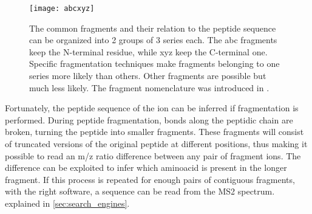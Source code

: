 \documentclass[thesis]{subfiles}
\begin{document}
\begin{figure}[!h]
\centering
\texttt{[image: abcxyz]}
\caption{The common fragments and their relation to the peptide sequence can be organized into 2 groups of 3 series each. The abc fragments keep the N-terminal residue, while xyz keep the C-terminal one. Specific fragmentation techniques make fragments belonging to one series more likely than others. Other fragments are possible but much less likely. The fragment nomenclature was introduced in \cite{Roepstorff1984}.}
\label{fig:abcxyz}
\end{figure}


Fortunately, the peptide sequence of the ion can be inferred if fragmentation is performed. During peptide fragmentation, bonds along the peptidic chain are broken, turning the peptide into smaller fragments. These fragments will consist of truncated versions of the original peptide at different positions, thus making it possible to read an \ac{m/z} ratio difference between any pair of fragment ions. The difference can be exploited to infer which aminoacid is present in the longer fragment. If this process is repeated for enough pairs of contiguous fragments, with the right software, a sequence can be read from the \ac{MS2} spectrum.  explained in \ref{sec:search_engines}.




%
%
 
\end{document}
